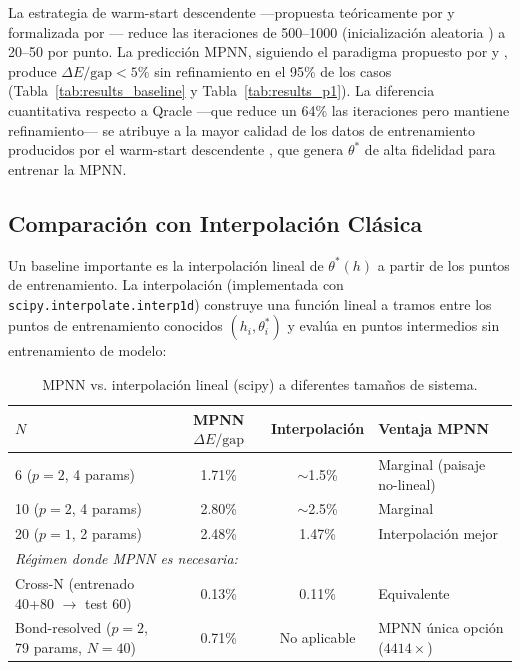 \documentclass[11pt,a4paper,spanish]{book}
\begin{document}
La estrategia de warm-start descendente ---propuesta teóricamente por \citet{mele2022} y formalizada por \citet{puig2025}--- reduce las iteraciones de 500--1000 (inicialización aleatoria \citep{tilly2022}) a 20--50 por punto. La predicción MPNN, siguiendo el paradigma propuesto por \citet{miao2024} y \citet{zhang2025}, produce $\Delta E/\text{gap} < 5\%$ sin refinamiento en el 95\% de los casos (Tabla~\ref{tab:results_baseline} y Tabla~\ref{tab:results_p1}). La diferencia cuantitativa respecto a Qracle \citep{zhang2025} ---que reduce un 64\% las iteraciones pero mantiene refinamiento--- se atribuye a la mayor calidad de los datos de entrenamiento producidos por el warm-start descendente \citep{puig2025, schiffer2026}, que genera $\theta^*$ de alta fidelidad para entrenar la MPNN.

\subsection{Comparación con Interpolación Clásica}

Un baseline importante es la interpolación lineal de $\theta^*(h)$ a partir de los puntos de entrenamiento. La interpolación (implementada con \texttt{scipy.interpolate.interp1d}) construye una función lineal a tramos entre los puntos de entrenamiento conocidos $(h_i, \theta^*_i)$ y evalúa en puntos intermedios sin entrenamiento de modelo:

\begin{table}[h]
\centering
\caption{MPNN vs. interpolación lineal (scipy) a diferentes tamaños de sistema.}
\label{tab:mpnn_vs_interp}
\begin{tabular}{lccl}
\toprule
\textbf{$N$} & \textbf{MPNN $\Delta E/\text{gap}$} & \textbf{Interpolación} & \textbf{Ventaja MPNN} \\
\midrule
6 ($p=2$, 4 params) & 1.71\% & $\sim$1.5\% & Marginal (paisaje no-lineal) \\
10 ($p=2$, 4 params) & 2.80\% & $\sim$2.5\% & Marginal \\
20 ($p=1$, 2 params) & 2.48\% & 1.47\% & Interpolación mejor \\
\midrule
\multicolumn{4}{l}{\textit{Régimen donde MPNN es necesaria:}} \\
Cross-N (entrenado 40+80 $\to$ test 60) & 0.13\% & 0.11\% & Equivalente \\
Bond-resolved ($p=2$, 79 params, $N=40$) & 0.71\% & No aplicable & MPNN única opción ($4414\times$) \\
\bottomrule
\end{tabular}
\end{table}
\end{document}

